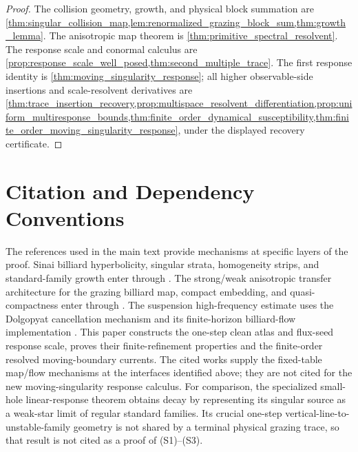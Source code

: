 \documentclass[11pt]{amsart}
\theoremstyle{compactplain}
\theoremstyle{compactdefinition}
\theoremstyle{compactremark}
\begin{document}
\begin{proof}
The collision geometry, growth, and physical block summation are
\cref{thm:singular_collision_map,lem:renormalized_grazing_block_sum,thm:growth_lemma}.
The anisotropic map theorem is \cref{thm:primitive_spectral_resolvent}.
The response scale and conormal calculus are
\cref{prop:response_scale_well_posed,thm:second_multiple_trace}.  The first
response identity is \cref{thm:moving_singularity_response}; all higher
observable-side insertions and scale-resolvent derivatives are
  \cref{thm:trace_insertion_recovery,prop:multispace_resolvent_differentiation,prop:uniform_multiresponse_bounds,thm:finite_order_dynamical_susceptibility,thm:finite_order_moving_singularity_response},
  under the displayed recovery certificate.
\end{proof}


\section{Citation and Dependency Conventions}
\label{app:citation_dependency_conventions}

The references used in the main text provide mechanisms at specific layers of
the proof.  Sinai billiard hyperbolicity, singular strata, homogeneity strips,
and standard-family growth enter through
\cite{Sinai1970,KatokStrelcyn1986,chernov2006chaotic,ChernovZhang2009}.  The
strong/weak anisotropic transfer architecture for the grazing billiard map,
compact embedding, and quasi-compactness enter through
\cite{DemersZhang2011,DemersZhang2013,Hennion1993,Baladi2000}.
The suspension high-frequency estimate uses the Dolgopyat cancellation
mechanism and its finite-horizon billiard-flow implementation
\cite{Dolgopyat1998,BaladiDemersLiverani2018}.  This paper constructs the
one-step clean atlas and flux-seed response scale, proves their
finite-refinement properties and the finite-order resolved
moving-boundary currents.  The cited works supply the fixed-table map/flow
mechanisms at the interfaces identified above; they are not cited for the new
moving-singularity response calculus.
For comparison, the specialized small-hole linear-response theorem
\cite{Canestrari2026SmallHoles} obtains decay by representing its singular
source as a weak-star limit of regular standard families.  Its crucial
one-step vertical-line-to-unstable-family geometry is not shared by a terminal
physical grazing trace, so that result is not cited as a proof of (S1)--(S3).
\end{document}
